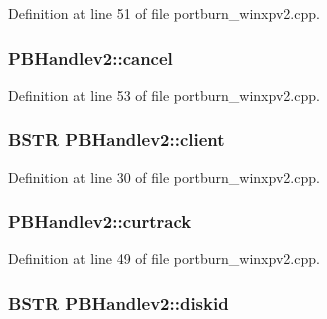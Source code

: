 Definition at line 51 of file portburn\+\_\+winxpv2.\+cpp.

\subsubsection[{\texorpdfstring{cancel}{cancel}}]{ P\+B\+Handlev2\+::cancel}\hypertarget{struct_p_b_handlev2_a7e9c5d7d155f5554fdea8da8c447da40}{}\label{struct_p_b_handlev2_a7e9c5d7d155f5554fdea8da8c447da40}


Definition at line 53 of file portburn\+\_\+winxpv2.\+cpp.

\subsubsection[{\texorpdfstring{client}{client}}]{\setlength{\rightskip}{0pt plus 5cm}B\+S\+TR P\+B\+Handlev2\+::client}\hypertarget{struct_p_b_handlev2_a9b8fa065de7bf55a2cb5e50dd69cb8a2}{}\label{struct_p_b_handlev2_a9b8fa065de7bf55a2cb5e50dd69cb8a2}


Definition at line 30 of file portburn\+\_\+winxpv2.\+cpp.

\subsubsection[{\texorpdfstring{curtrack}{curtrack}}]{ P\+B\+Handlev2\+::curtrack}\hypertarget{struct_p_b_handlev2_a3c343bdc80d8687dba13f4152f2a02d9}{}\label{struct_p_b_handlev2_a3c343bdc80d8687dba13f4152f2a02d9}


Definition at line 49 of file portburn\+\_\+winxpv2.\+cpp.

\subsubsection[{\texorpdfstring{diskid}{diskid}}]{\setlength{\rightskip}{0pt plus 5cm}B\+S\+TR P\+B\+Handlev2\+::diskid}\hypertarget{struct_p_b_handlev2_a1ad0eba4b5b78e15feb16db5f3c3ddd4}{}\label{struct_p_b_handlev2_a1ad0eba4b5b78e15feb16db5f3c3ddd4}



